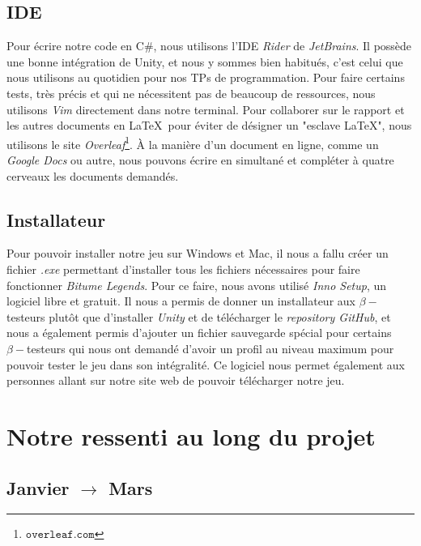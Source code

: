 \documentclass[a4paper,12pt]{article}
\newcommand{\btmlgs}{\textsl{Bitume Legends}}
\begin{document}
        \subsection{IDE}
            Pour écrire notre code en C\#, nous utilisons l'IDE \textsl{Rider} de 
            \textsl{JetBrains}. Il possède une bonne intégration de Unity, et nous
            y sommes bien habitués, c'est celui que nous utilisons au quotidien pour
            nos TPs de programmation. Pour faire certains tests, très précis et qui
            ne nécessitent pas de beaucoup de ressources, nous utilisons \textsl{Vim}
            directement dans notre terminal.
            Pour collaborer sur le rapport et les autres documents en \LaTeX\, 
            pour éviter de désigner un "esclave \LaTeX", nous utilisons le site 
            \textsl{Overleaf}\footnote{\(\mathtt{overleaf.com}\)}. 
            À la manière d'un document en ligne, comme 
            un \textsl{Google Docs} ou autre, nous pouvons écrire en
            simultané et compléter à quatre cerveaux les documents demandés.
            
        \subsection{Installateur} 
         
        Pour pouvoir installer notre jeu sur Windows et Mac, il nous a fallu créer un fichier \textsl{.exe} permettant d'installer tous les fichiers nécessaires pour faire fonctionner \btmlgs.
        Pour ce faire, nous avons utilisé \textsl{Inno Setup}, un logiciel libre et gratuit. Il nous a permis de donner un installateur aux \(\beta-\)testeurs plutôt que d'installer \textsl{Unity}
        et de télécharger le \textsl{repository GitHub}, et nous a également permis d'ajouter un fichier sauvegarde spécial pour certains \(\beta-\)testeurs qui nous ont demandé d'avoir un profil au niveau maximum pour pouvoir tester le jeu dans son intégralité. Ce logiciel nous permet également aux personnes allant sur notre site web de pouvoir télécharger notre jeu.

    
    \section{Notre ressenti au long du projet}
    \subsection{Janvier $\to$ Mars}
\end{document}
